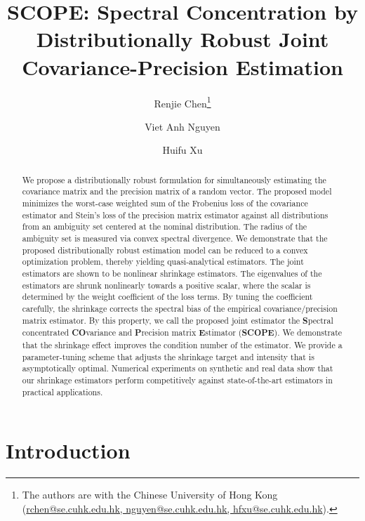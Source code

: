 \documentclass[11pt]{article}
\title{SCOPE: Spectral Concentration by \\Distributionally Robust Joint Covariance-Precision Estimation}
\author{Renjie Chen\thanks{The authors are with the Chinese University of Hong Kong (\url{rchen@se.cuhk.edu.hk, nguyen@se.cuhk.edu.hk, hfxu@se.cuhk.edu.hk}).} \and Viet Anh Nguyen\footnotemark[1] \and Huifu Xu\footnotemark[1]}
\date{}
\begin{document}
\maketitle

\begin{abstract}
    We propose a distributionally robust formulation for simultaneously estimating the covariance matrix and the precision matrix of a random vector. 
    The proposed model minimizes the worst-case weighted sum of the Frobenius loss of the covariance estimator and Stein's loss of the precision matrix estimator against all distributions from an ambiguity set centered at the nominal distribution. The radius of the ambiguity set is measured via convex spectral divergence. We demonstrate that the proposed distributionally robust estimation model can be reduced to a convex optimization problem, thereby yielding quasi-analytical estimators. The joint estimators are shown to be nonlinear shrinkage estimators. The eigenvalues of the estimators are shrunk nonlinearly towards a positive scalar, where the scalar is determined by the weight coefficient of the loss terms. By tuning the coefficient carefully, the shrinkage corrects the spectral bias of the empirical covariance/precision matrix estimator.
    By this property, we call the proposed joint estimator the \textbf{S}pectral concentrated \textbf{CO}variance and \textbf{P}recision matrix \textbf{E}stimator (\textbf{SCOPE}). We demonstrate that the shrinkage effect improves the condition number of the estimator. We provide a parameter-tuning scheme that adjusts the shrinkage target and intensity that is asymptotically optimal. Numerical experiments on synthetic and real data show that our shrinkage estimators perform competitively against state-of-the-art estimators in practical applications. 
\end{abstract}





\section{Introduction}
\end{document}
